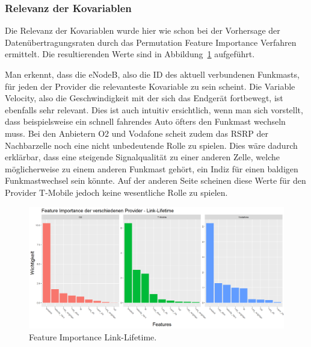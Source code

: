 \subsubsection{Relevanz der Kovariablen}

Die Relevanz der Kovariablen wurde hier wie schon bei der Vorhersage der Daten\"ubertragungsraten durch das
Permutation Feature Importance Verfahren ermittelt.
Die resultierenden Werte sind in Abbildung~\ref{fig:feature-importance-link-lifetime} aufgef\"uhrt.

Man erkennt, dass die eNodeB, also die ID des aktuell verbundenen Funkmasts, f\"ur jeden der Provider die relevanteste
Kovariable zu sein scheint. Die Variable Velocity, also die Geschwindigkeit mit der sich das Endger\"at fortbewegt, 
ist ebenfalls sehr relevant. Dies ist auch intuitiv ersichtlich, wenn man sich vorstellt, dass beispielsweise ein schnell
fahrendes Auto \"ofters den Funkmast wechseln muss. Bei den Anbietern O2 und Vodafone scheit zudem das RSRP der Nachbarzelle
noch eine nicht unbedeutende Rolle zu spielen. Dies w\"are dadurch erkl\"arbar, dass eine steigende Signalqualit\"at zu einer
anderen Zelle, welche m\"oglicherweise zu einem anderen Funkmast geh\"ort, ein Indiz f\"ur einen baldigen Funkmastwechsel sein k\"onnte.
Auf der anderen Seite scheinen diese Werte f\"ur den Provider T-Mobile jedoch keine wesentliche Rolle zu spielen.
\begin{figure}
    \centering
    \includegraphics[width=\textwidth]{abbildungen/feature_importance_linklifetime}
    \caption{Feature Importance Link-Lifetime.}
    \label{fig:feature-importance-link-lifetime}
\end{figure}